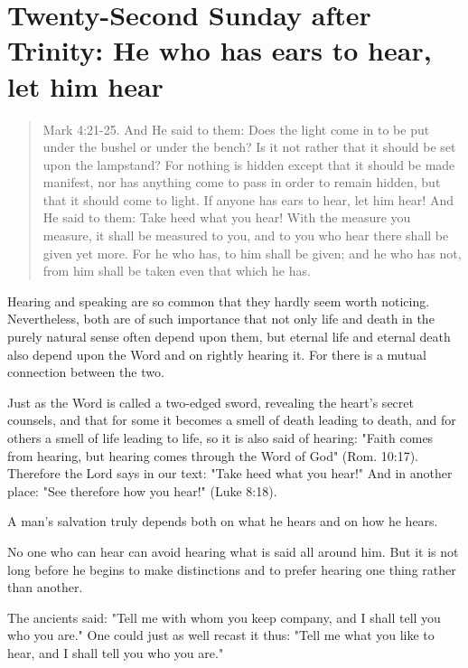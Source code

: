 
\section{Twenty-Second Sunday after Trinity: He who has ears to hear, let him hear}

\begin{quote}

Mark 4:21-25. And He said to them: Does the light come in to be put under the bushel or under the bench? Is it not rather that it should be set upon the lampstand? For nothing is hidden except that it should be made manifest, nor has anything come to pass in order to remain hidden, but that it should come to light. If anyone has ears to hear, let him hear! And He said to them: Take heed what you hear! With the measure you measure, it shall be measured to you, and to you who hear there shall be given yet more. For he who has, to him shall be given; and he who has not, from him shall be taken even that which he has.

\end{quote}

\bigskip

Hearing and speaking are so common that they hardly seem worth noticing. Nevertheless, both are of such importance that not only life and death in the purely natural sense often depend upon them, but eternal life and eternal death also depend upon the Word and on rightly hearing it. For there is a mutual connection between the two.

Just as the Word is called a two-edged sword, revealing the heart’s secret counsels, and that for some it becomes a smell of death leading to death, and for others a smell of life leading to life, so it is also said of hearing: "Faith comes from hearing, but hearing comes through the Word of God" (Rom. 10:17). Therefore the Lord says in our text: "Take heed what you hear!" And in another place: "See therefore how you hear!" (Luke 8:18).

A man’s salvation truly depends both on what he hears and on how he hears.

No one who can hear can avoid hearing what is said all around him. But it is not long before he begins to make distinctions and to prefer hearing one thing rather than another.

The ancients said: "Tell me with whom you keep company, and I shall tell you who you are." One could just as well recast it thus: "Tell me what you like to hear, and I shall tell you who you are."

